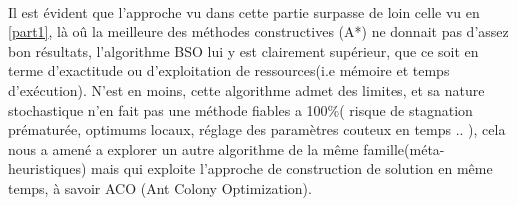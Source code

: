 	\paragraph{}
	Il est évident que l'approche vu dans cette partie surpasse de loin celle vu en  \ref{part1}, là oû la meilleure des méthodes constructives (A*) ne donnait pas d'assez bon résultats, l'algorithme BSO lui y est clairement supérieur, que ce soit en terme d'exactitude ou d'exploitation de ressources(i.e mémoire et temps d'exécution). N'est en moins, cette algorithme admet des limites, et sa nature stochastique n'en fait pas une méthode fiables a 100\%( risque de stagnation prématurée, optimums locaux, réglage des paramètres couteux en temps .. ), cela nous a amené a explorer un autre algorithme de la même famille(méta-heuristiques) mais qui exploite l'approche de construction de solution en même temps, à savoir ACO (Ant Colony Optimization).
